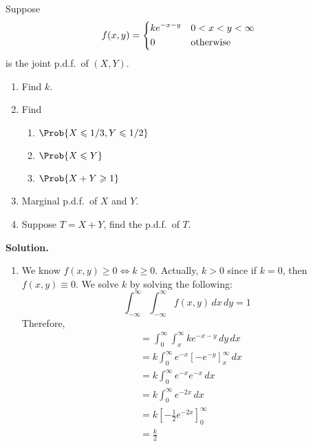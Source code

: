 \begin{Example}{}{}
    Suppose
    \[ f(x,y)=\begin{dcases}
            ke^{-x-y} & 0<x<y<\infty     \\
            0         & \text{otherwise}
        \end{dcases} \]
    is the joint p.d.f.\ of $ (X,Y) $.
    \begin{enumerate}[label=(\roman*)]
        \item Find $ k $.
        \item Find
              \begin{enumerate}[label=(\alph*)]
                  \item $ \Prob{X\leqslant 1/3,Y\leqslant 1/2} $
                  \item $ \Prob{X\leqslant Y} $
                  \item $ \Prob{X+Y\geqslant 1} $
              \end{enumerate}
        \item Marginal p.d.f.\ of $ X $ and $ Y $.
        \item Suppose $ T=X+Y $, find the p.d.f.\ of $ T $.
    \end{enumerate}
    \textbf{Solution.}
    \begin{enumerate}[label=(\roman*)]
        \item We know $ f(x,y)\geqslant 0\iff k\geqslant 0 $. Actually,
              $ k>0 $ since if $ k=0 $, then $ f(x,y)\equiv 0 $.
              We solve $ k $ by solving the following:
              \[ \int_{-\infty}^{\infty} \int_{-\infty}^{\infty} f(x,y)\, d{x} \, d{y} =1 \]
              Therefore,
              \begin{align*}
                   & =\int_{0}^{\infty} \int_{x}^{\infty} ke^{-x-y}\, d{y} \, d{x}     \\
                   & =k \int_{0}^{\infty} e^{-x}\left[ -e^{-y} \right]_x^\infty\, d{x} \\
                   & =k \int_{0}^{\infty} e^{-x}e^{-x}\, d{x}                          \\
                   & =k \int_{0}^{\infty} e^{-2x}\, d{x}                               \\
                   & =k\left[ -\frac{1}{2} e^{-2x} \right]_0^\infty                    \\
                   & =\frac{k}{2}
              \end{align*}


\end{enumerate}
\end{Example}
